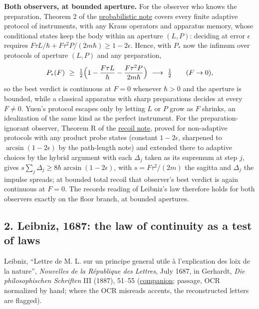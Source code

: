 \documentclass[11pt,a4paper]{article}
\begin{document}
\textbf{Both observers, at bounded aperture.} For the observer who knows
the preparation, Theorem 2 of the
\href{record-distance-path-length.md\#single-shot-displacement-and-the-aperture-theorem}{probabilistic
note} covers every finite adaptive protocol of instruments, with any
Kraus operators and apparatus memory, whose conditional states keep the
body within an aperture \((L,P)\): deciding at error \(\epsilon\)
requires \(F\tau L/\hbar+F\tau^2P/(2m\hbar)\ge1-2\epsilon\). Hence, with
\(P_*\) now the infimum over protocols of aperture \((L,P)\) and any
preparation,
\[P_*(F)\ \ge\ \tfrac12\Bigl(1-\frac{F\tau L}\hbar-\frac{F\tau^2P}{2m\hbar}\Bigr)\ \longrightarrow\ \tfrac12\qquad(F\to0),\]
so the best verdict is continuous at \(F=0\) whenever \(\hbar>0\) and
the aperture is bounded, while a classical apparatus with sharp
preparations decides at every \(F\ne0\). Yuen's protocol escapes only by
letting \(L\) or \(P\) grow as \(F\) shrinks, an idealization of the
same kind as the perfect instrument. For the preparation-ignorant
observer, Theorem R of the
\href{record-distance-path-length.md\#recoil-only-bound-for-arbitrary-probe-states}{recoil
note}, proved for non-adaptive protocols with any product probe states
(constant \(1-2\epsilon\), sharpened to \(\arcsin(1-2\epsilon)\) by the
path-length note) and extended there to adaptive choices by the hybrid
argument with each \(\Delta_j\) taken as its supremum at step \(j\),
gives \(s\sum_j\Delta_j\ge8\hbar\arcsin(1-2\epsilon)\), with
\(s=F\tau^2/(2m)\) the sagitta and \(\Delta_j\) the impulse spreads; at
bounded total recoil that observer's best verdict is again continuous at
\(F=0\). The records reading of Leibniz's law therefore holds for both
observers exactly on the floor branch, at bounded apertures.

\hypertarget{leibniz-1687-the-law-of-continuity-as-a-test-of-laws}{%
\subsection{2. Leibniz, 1687: the law of continuity as a test of
laws}\label{leibniz-1687-the-law-of-continuity-as-a-test-of-laws}}

Leibniz, ``Lettre de M. L. sur un principe general utile à l'explication
des loix de la nature'', \emph{Nouvelles de la République des Lettres},
July 1687, in Gerhardt, \emph{Die philosophischen Schriften} III (1887),
51--55
(\href{../docs/classics/Leibniz_PrincipeGeneral_1687_Gerhardt3_OCR.md}{companion};
passage, OCR normalized by hand; where the OCR misreads accents, the
reconstructed letters are flagged).
\end{document}
